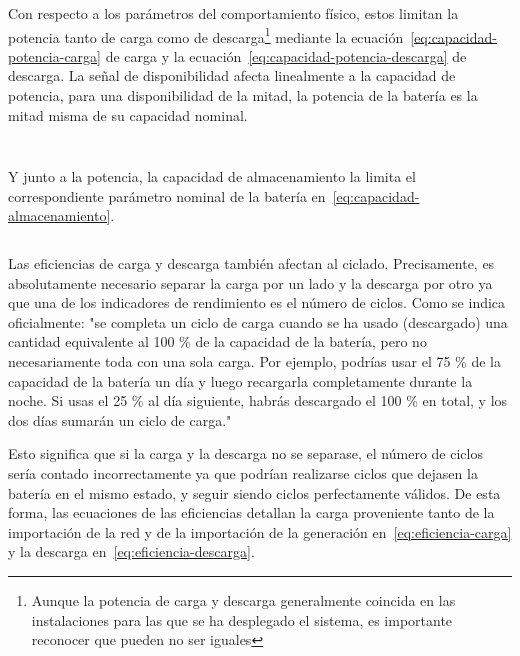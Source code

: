 Con respecto a los parámetros del comportamiento físico, estos limitan la potencia tanto de carga como de descarga\footnote{Aunque la potencia de carga y descarga generalmente coincida en las instalaciones para las que se ha desplegado el sistema, es importante reconocer que pueden no ser iguales} mediante la ecuación~\ref{eq:capacidad-potencia-carga} de carga y la ecuación~\ref{eq:capacidad-potencia-descarga} de descarga. La señal de disponibilidad afecta linealmente a la capacidad de potencia, para una disponibilidad de la mitad, la potencia de la batería es la mitad misma de su capacidad nominal.

\begin{equation}
  \label{eq:capacidad-potencia-carga}
\end{equation}

\begin{equation}
  \label{eq:capacidad-potencia-descarga}
\end{equation}

Y junto a la potencia, la capacidad de almacenamiento la limita el correspondiente parámetro nominal de la batería en~\ref{eq:capacidad-almacenamiento}.

\begin{equation}
  \label{eq:capacidad-almacenamiento}
\end{equation}

Las eficiencias de carga y descarga también afectan al ciclado. Precisamente, es absolutamente necesario separar la carga por un lado y la descarga por otro ya que una de los indicadores de rendimiento es el número de ciclos. Como se indica oficialmente: "se completa un ciclo de carga cuando se ha usado (descargado) una cantidad equivalente al 100 \% de la capacidad de la batería, pero no necesariamente toda con una sola carga. Por ejemplo, podrías usar el 75 \% de la capacidad de la batería un día y luego recargarla completamente durante la noche. Si usas el 25 \% al día siguiente, habrás descargado el 100 \% en total, y los dos días sumarán un ciclo de carga."

Esto significa que si la carga y la descarga no se separase, el número de ciclos sería contado incorrectamente ya que podrían realizarse ciclos que dejasen la batería en el mismo estado, y seguir siendo ciclos perfectamente válidos. De esta forma, las ecuaciones de las eficiencias detallan la carga proveniente tanto de la importación de la red y de la importación de la generación en~\ref{eq:eficiencia-carga} y la descarga en~\ref{eq:eficiencia-descarga}.

